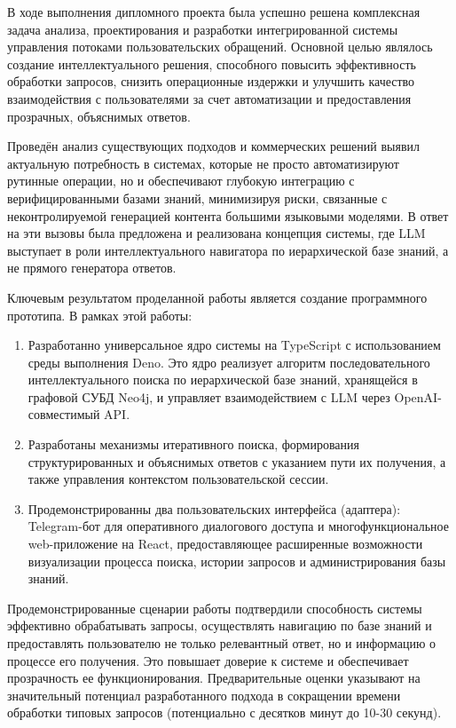 
В ходе выполнения дипломного проекта была успешно решена комплексная задача анализа, проектирования и разработки интегрированной системы управления потоками пользовательских обращений. Основной целью являлось создание интеллектуального решения, способного повысить эффективность обработки запросов, снизить операционные издержки и улучшить качество взаимодействия с пользователями за счет автоматизации и предоставления прозрачных, объяснимых ответов.

Проведён анализ существующих подходов и коммерческих решений выявил актуальную потребность в системах, которые не просто автоматизируют рутинные операции, но и обеспечивают глубокую интеграцию с верифицированными базами знаний, минимизируя риски, связанные с неконтролируемой генерацией контента большими языковыми моделями. В ответ на эти вызовы была предложена и реализована концепция системы, где LLM выступает в роли интеллектуального навигатора по иерархической базе знаний, а не прямого генератора ответов.

Ключевым результатом проделанной работы является создание программного прототипа. В рамках этой работы:

\begin{enumerate}[label=\arabic*]
    \item Разработанно универсальное ядро системы на TypeScript с использованием среды выполнения Deno. Это ядро реализует алгоритм последовательного интеллектуального поиска по иерархической базе знаний, хранящейся в графовой СУБД Neo4j, и управляет взаимодействием с LLM через OpenAI-совместимый API.
    \item Разработаны механизмы итеративного поиска, формирования структурированных и объяснимых ответов с указанием пути их получения, а также управления контекстом пользовательской сессии.
    \item Продемонстрированны два пользовательских интерфейса (адаптера): Telegram-бот для оперативного диалогового доступа и многофункциональное web-приложение на React, предоставляющее расширенные возможности визуализации процесса поиска, истории запросов и администрирования базы знаний.
\end{enumerate}

Продемонстрированные сценарии работы подтвердили способность системы эффективно обрабатывать запросы, осуществлять навигацию по базе знаний и предоставлять пользователю не только релевантный ответ, но и информацию о процессе его получения. Это повышает доверие к системе и обеспечивает прозрачность ее функционирования. Предварительные оценки указывают на значительный потенциал разработанного подхода в сокращении времени обработки типовых запросов (потенциально с десятков минут до 10-30 секунд).


